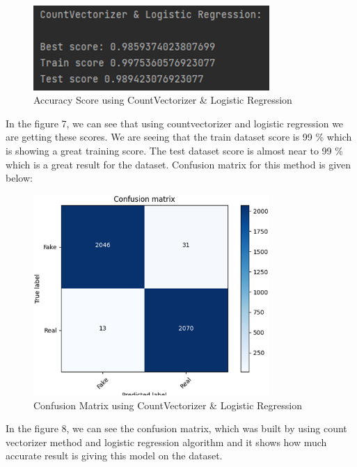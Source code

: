 \documentclass{article}
\begin{document}
    \begin{figure}[!h]
    \centering
    \includegraphics[width=0.8\textwidth]{image7.png}
    \caption{Accuracy Score using CountVectorizer \& Logistic Regression}
    \label{fig:label}
    \end{figure}\break
In the figure 7, we can see that using countvectorizer and logistic regression we are getting these scores. We are seeing that the train dataset score is 99 \% which is showing a great training score. The test dataset score is almost near to 99 \% which is a great result for the dataset. Confusion matrix for this method is given below: \break
   \begin{figure}[!h]
    \centering
    \includegraphics[width=0.8\textwidth]{image8.png}
    \caption{Confusion Matrix using CountVectorizer \& Logistic Regression}
    \label{fig:label}
    \end{figure}\break
    In the figure 8, we can see the confusion matrix, which was built by using count vectorizer method and logistic regression algorithm and it shows how much accurate result is giving this model on the dataset.
\end{document}
